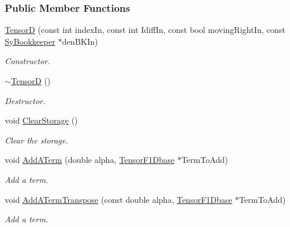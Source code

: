 \subsubsection*{Public Member Functions}
\begin{DoxyCompactItemize}
\item 
\hyperlink{classCheMPS2_1_1TensorD_ad9bfedc79e5bcd731b7bab893b88fa88}{Tensor\-D} (const int index\-In, const int Idiff\-In, const bool moving\-Right\-In, const \hyperlink{classCheMPS2_1_1SyBookkeeper}{Sy\-Bookkeeper} $\ast$den\-B\-K\-In)
\begin{DoxyCompactList}\small\item\em Constructor. \end{DoxyCompactList}\item 
\hypertarget{classCheMPS2_1_1TensorD_aa9cc270346429692e580a3b7cc5890f2}{\hyperlink{classCheMPS2_1_1TensorD_aa9cc270346429692e580a3b7cc5890f2}{$\sim$\-Tensor\-D} ()}\label{classCheMPS2_1_1TensorD_aa9cc270346429692e580a3b7cc5890f2}

\begin{DoxyCompactList}\small\item\em Destructor. \end{DoxyCompactList}\item 
\hypertarget{classCheMPS2_1_1TensorD_aa50056f6f5e242f8933c3ed0177faade}{void \hyperlink{classCheMPS2_1_1TensorD_aa50056f6f5e242f8933c3ed0177faade}{Clear\-Storage} ()}\label{classCheMPS2_1_1TensorD_aa50056f6f5e242f8933c3ed0177faade}

\begin{DoxyCompactList}\small\item\em Clear the storage. \end{DoxyCompactList}\item 
void \hyperlink{classCheMPS2_1_1TensorD_a62fdb77e0a88f0ae6a21078b433b01db}{Add\-A\-Term} (double alpha, \hyperlink{classCheMPS2_1_1TensorF1Dbase}{Tensor\-F1\-Dbase} $\ast$Term\-To\-Add)
\begin{DoxyCompactList}\small\item\em Add a term. \end{DoxyCompactList}\item 
void \hyperlink{classCheMPS2_1_1TensorD_a18e3f1730c2f05d7334ca0331c279088}{Add\-A\-Term\-Transpose} (const double alpha, \hyperlink{classCheMPS2_1_1TensorF1Dbase}{Tensor\-F1\-Dbase} $\ast$Term\-To\-Add)
\begin{DoxyCompactList}\small\item\em Add a term. \end{DoxyCompactList}\end{DoxyCompactItemize}
